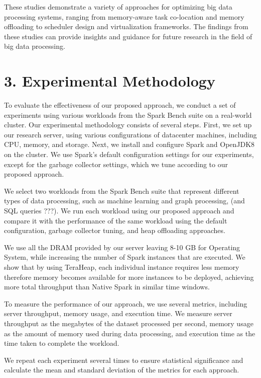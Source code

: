\documentclass[twocolumn,10pt]{asme2e}
\begin{document}
These studies demonstrate a variety of approaches for optimizing big data processing systems, ranging from memory-aware task co-location and memory offloading to scheduler design and virtualization frameworks. The findings from these studies can provide insights and guidance for future research in the field of big data processing.

\section*{3. Experimental Methodology}

To evaluate the effectiveness of our proposed approach, we conduct a set of experiments using various workloads from the Spark Bench suite on a real-world cluster. Our experimental methodology consists of several steps. First, we set up our research server, using various configurations of datacenter machines, including CPU, memory, and storage. Next, we install and configure Spark and OpenJDK8 on the cluster. We use Spark's default configuration settings for our experiments, except for the garbage collector settings, which we tune according to our proposed approach.

We select two workloads from the Spark Bench suite that represent different types of data processing, such as machine learning and graph processing, (and SQL queries ???). We run each workload using our proposed approach and compare it with the performance of the same workload using the default configuration, garbage collector tuning, and heap offloading approaches.

We use all the DRAM provided by our server leaving 8-10 GB for Operating System, while increasing the number of Spark instances that are executed. We show that by using TeraHeap, each individual instance requires less memory therefore memory becomes available for more instances to be deployed, achieving more total throughput than Native Spark in similar time windows.

To measure the performance of our approach, we use several metrics, including server throughput, memory usage, and execution time. We measure server throughput as the megabytes of the dataset processed per second, memory usage as the amount of memory used during data processing, and execution time as the time taken to complete the workload.

We repeat each experiment several times to ensure statistical significance and calculate the mean and standard deviation of the metrics for each approach.
\end{document}

